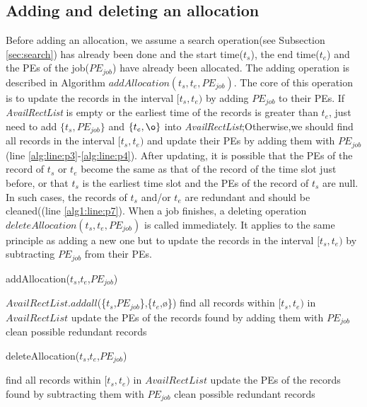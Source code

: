 \documentclass[preprint,12pt]{elsarticle}
\begin{document}
\subsection{Adding and deleting an allocation}

Before adding an allocation, we assume a search operation(see Subsection \ref{sec:search}) has already been done and the start time($t_s$), the end time($t_e$) and the PEs of the job($PE_{job}$) have already been allocated. The adding operation is described in Algorithm $addAllocation(t_s, t_e, PE_{job})$. The core of this operation is to update the records in the interval $[t_s,t_e)$ by adding $PE_{job}$ to their PEs. If \emph{AvailRectList} is empty or the earliest time of the records is greater than $t_e$, just need to add $\{t_s, PE_{job}\}$ and $\{t_e, \o\}$ into \emph{AvailRectList};Otherwise,we should find all records in the interval $[t_s,t_e)$ and update their PEs by adding them with $PE_{job}$(line \ref{alg:line:p3}-\ref{alg:line:p4}). After updating, it is possible that the PEs of the record of $t_s$ or $t_e$ become the same as that of the record of the time slot just before, or that $t_s$ is the earliest time slot and the PEs of the record of $t_s$ are null. In such cases, the records of $t_s$ and/or $t_e$ are redundant and should be cleaned((line \ref{alg1:line:p7}). When a job finishes, a deleting operation $deleteAllocation(t_s, t_e, PE_{job})$ is called immediately. It applies to the same principle as adding a new one but to update the records in the interval $[t_s, t_e)$ by subtracting $PE_{job}$ from their PEs.


\begin{algorithm}[htbp]
\caption{addAllocation($t_{s}$,$t_{e}$,$PE_{job}$)}
\label{alg:add}

    {
        $AvailRectList.addall$(\{$t_{s}$,$PE_{job}$\},\{$t_{e}$,\o\})\;
        \label{alg:line:p1}
    }
    {
        find all records within $[t_s,t_e)$ in $AvailRectList$\;\label{alg:line:p3}
        update the PEs of the records found by adding them with $PE_{job}$\;\label{alg:line:p4}
    \label{alg1:line:p6}
    }
clean possible redundant records\;
\label{alg1:line:p7}
\end{algorithm}




\begin{algorithm}[htbp]
\caption{deleteAllocation($t_{s}$,$t_{e}$,$PE_{job}$)}
\label{alg:delete}
find all records within $[t_s,t_e)$ in $AvailRectList$\;
update the PEs of the records found by subtracting them with $PE_{job}$\;
clean possible redundant records\;
\end{algorithm}
\end{document}
